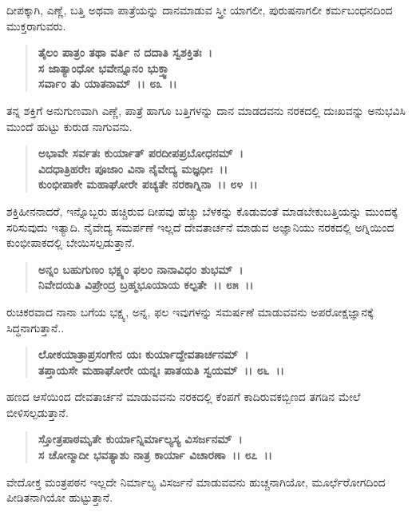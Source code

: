 ದೀಪಕ್ಕಾಗಿ, ಎಣ್ಣೆ, ಬತ್ತಿ ಅಥವಾ ಪಾತ್ರೆಯನ್ನು ದಾನಮಾಡುವ ಸ್ತ್ರೀ ಯಾಗಲೀ, ಪುರುಷನಾಗಲೀ ಕರ್ಮಬಂಧನದಿಂದ ಮುಕ್ತರಾಗುವರು.

\begin{verse}
\textbf{ತೈಲಂ ಪಾತ್ರಂ ತಥಾ ವರ್ತಿ ನ ದದಾತಿ ಸ್ವಶಕ್ತಿತಃ~। }\\\textbf{ಸ ಜಾತ್ಯಾಂಧೋ ಭವೇನ್ನೂನಂ ಭುಕ್ತ್ವಾ}\\\textbf{ ಸರ್ವಾಂ ತು ಯಾತನಾಮ್~।। ೮೩~।।}
\end{verse}

ತನ್ನ ಶಕ್ತಿಗೆ ಅನುಗುಣವಾಗಿ ಎಣ್ಣೆ, ಪಾತ್ರೆ ಹಾಗೂ ಬತ್ತಿಗಳನ್ನು ದಾನ ಮಾಡದವನು ನರಕದಲ್ಲಿ ದುಃಖವನ್ನು ಅನುಭವಿಸಿ ಮುಂದೆ ಹುಟ್ಟು ಕುರುಡ ನಾಗುವನು.

\begin{verse}
\textbf{ಅಭಾವೇ ಸರ್ವತಃ ಕುರ್ಯಾತ್ ಪರದೀಪಪ್ರಬೋಧನಮ್~।}\\\textbf{ವಿದಧಾತ್ರಿಹರೇಃ ಪೂಜಾಂ ವಿನಾ ನೈವೇದ್ಯ ಮಜ್ಞಧೀಃ~।।}\\\textbf{ಕುಂಭೀಪಾಕೇ ಮಹಾಘೋರೇ ಪಚ್ಯತೇ ನರಕಾಗ್ನಿನಾ~।। ೮೪~।।}
\end{verse}

ಶಕ್ತಿಹೀನನಾದರೆ, ಇನ್ನೊಬ್ಬರು ಹಚ್ಚಿರುವ ದೀಪವು ಹೆಚ್ಚು ಬೆಳಕನ್ನು ಕೊಡುವಂತೆ ಮಾಡಬೇಕು\enginline{-}ಬತ್ತಿಯನ್ನು ಮುಂದಕ್ಕೆ ಸರಿಸುವುದು ಇತ್ಯಾದಿ. ನೈವೇದ್ಯ ಸಮರ್ಪಣೆ ಇಲ್ಲದೆ ದೇವತಾರ್ಚನೆ ಮಾಡುವ ಅಜ್ಞಾನಿಯು ನರಕದಲ್ಲಿ ಅಗ್ನಿಯಿಂದ ಕುಂಭೀಪಾಕದಲ್ಲಿ ಬೇಯಿಸಲ್ಪಡುತ್ತಾನೆ.

\begin{verse}
\textbf{ಅನ್ನಂ ಬಹುಗುಣಂ ಭಕ್ಷ್ಯಂ ಫಲಂ ನಾನಾವಿಧಂ ಶುಭಮ್~।}\\\textbf{ನಿವೇದಯತಿ ವಿಪ್ರೇಂದ್ರ ಬ್ರಹ್ಮಭೂಯಾಯ ಕಲ್ಪತೇ~।। ೮೫~।।}
\end{verse}

ರುಚಿಕರವಾದ ನಾನಾ ಬಗೆಯ ಭಕ್ಷ್ಯ, ಅನ್ನ, ಫಲ ಇವುಗಳನ್ನು ಸಮರ್ಷಣೆ ಮಾಡುವವನು ಅಪರೋಕ್ಷಜ್ಞಾನಕ್ಕೆ ಸಿದ್ಧನಾಗುತ್ತಾನೆ..

\begin{verse}
\textbf{ಲೋಕಯಾತ್ರಾಪ್ರಸಂಗೇನ ಯಃ ಕುರ್ಯಾದ್ದೇವತಾರ್ಚನಮ್~।}\\\textbf{ತಪ್ತಾಯಸೇ ಮಹಾಘೋರೇ ಯನ್ನಃ ಪಾತಯತಿ ಸ್ವಯಮ್~।। ೮೬~।।}
\end{verse}

ಹಣದ ಆಸೆಯಿಂದ ದೇವತಾರ್ಚನೆ ಮಾಡುವವನು ನರಕದಲ್ಲಿ ಕೆಂಪಗೆ ಕಾದಿರುವ\break ಕಬ್ಬಿಣದ ತಗಡಿನ ಮೇಲೆ ಬೀಳಿಸಲ್ಪಡುತ್ತಾನೆ.

\begin{verse}
\textbf{ಸ್ತೋತ್ರಪಾಠಮೃತೇ ಕುರ್ಯಾನ್ನಿರ್ಮಾಲ್ಯಸ್ಯ ವಿಸರ್ಜನಮ್~।}\\\textbf{ಸ ಚೋನ್ಮಾದೀ ಭವತ್ಯಾಶು ನಾತ್ರ ಕಾರ್ಯಾ ವಿಚಾರಣಾ~।। ೮೭~।।}
\end{verse}

ವೇದೋಕ್ತ ಮಂತ್ರಪಠನ ಇಲ್ಲದೇ ನಿರ್ಮಾಲ್ಯ ವಿಸರ್ಜನೆ ಮಾಡುವವನು ಹುಚ್ಚನಾಗಿಯೋ, ಮೂರ್ಛೆರೋಗದಿಂದ ಪೀಡಿತನಾಗಿಯೋ ಹುಟ್ಟುತ್ತಾನೆ.

